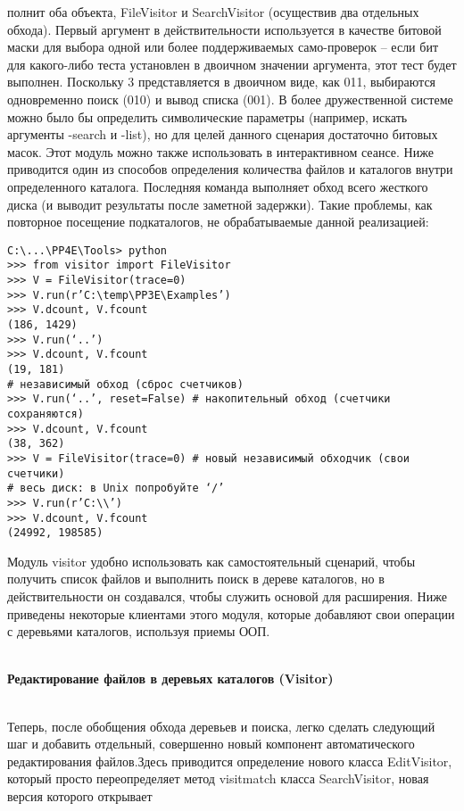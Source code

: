 \documentclass[12pt]{article}
\begin{document}
полнит оба объекта, FileVisitor и SearchVisitor (осуществив два отдельных обхода). Первый аргумент в действительности используется в качестве битовой маски для выбора одной или более поддерживаемых само-проверок – если бит для какого-либо теста установлен в двоичном значении аргумента, этот тест будет выполнен. Поскольку 3 представляется
в двоичном виде, как 011, выбираются одновременно поиск (010) и вывод
списка (001). В более дружественной сис­теме можно было бы определить
символические параметры (например, искать аргументы -search и -list),
но для целей данного сценария достаточно битовых масок.
Этот модуль можно также использовать в интерактивном
сеансе. Ниже приводится один из способов определения количества
файлов и каталогов внутри определенного каталога. Последняя команда выполняет обход всего жесткого диска (и выводит результаты после
заметной задержки). Такие проблемы, как повторное посещение подкаталогов, не обрабатываемые данной реализацией:
\begin{verbatim}
C:\...\PP4E\Tools> python
>>> from visitor import FileVisitor
>>> V = FileVisitor(trace=0)
>>> V.run(r’C:\temp\PP3E\Examples’)
>>> V.dcount, V.fcount
(186, 1429)
>>> V.run(‘..’)
>>> V.dcount, V.fcount
(19, 181)
# независимый обход (сброс счетчиков)
>>> V.run(‘..’, reset=False) # накопительный обход (счетчики сохраняются)
>>> V.dcount, V.fcount
(38, 362)
>>> V = FileVisitor(trace=0) # новый независимый обходчик (свои счетчики)
# весь диск: в Unix попробуйте ‘/’
>>> V.run(r’C:\\’)
>>> V.dcount, V.fcount
(24992, 198585)
\end{verbatim}
Модуль visitor удобно использовать как самостоятельный сценарий,
чтобы получить список файлов и выполнить поиск в дереве каталогов,
но в действительности он создавался, чтобы служить основой для расширения. Ниже приведены
некоторые клиентами этого модуля, которые добавляют свои операции с деревьями каталогов, используя приемы ООП.\\ \\
\begin{large}
\textbf{Редактирование файлов в деревьях каталогов (Visitor)} \\ \\
\end{large}
Теперь, после обобщения обхода деревьев и поиска, легко сделать следующий шаг и добавить отдельный, совершенно новый компонент автоматического редактирования файлов.Здесь приводится
определение нового класса EditVisitor, который просто переопределяет
метод visitmatch класса SearchVisitor, новая версия которого открывает
\end{document}
